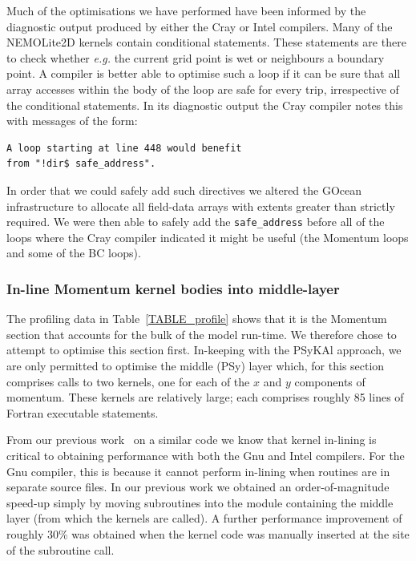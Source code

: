 \documentclass[gmdd, manuscript]{copernicus}
\begin{document}
Much of the optimisations we have performed have been informed by the
diagnostic output produced by either the Cray or Intel compilers. Many
of the NEMOLite2D kernels contain conditional statements. These
statements are there to check whether \textit{e.g.} the current grid
point is wet or neighbours a boundary point. A compiler is better able
to optimise such a loop if it can be sure that all array accesses
within the body of the loop are safe for every trip, irrespective of
the conditional statements. In its diagnostic output the Cray compiler
notes this with messages of the form:
\begin{verbatim}
A loop starting at line 448 would benefit 
from "!dir$ safe_address".
\end{verbatim}
In order that we could safely add such directives we altered the
GOcean infrastructure to allocate all field-data arrays with extents
greater than strictly required.  We were then able to safely add the
\texttt{safe\_address} before all of the loops where the Cray compiler
indicated it might be useful (the Momentum loops and some of the BC
loops).

\subsubsection{In-line Momentum kernel bodies into middle-layer}
\label{sec_inline_mom}

The profiling data in Table~\ref{TABLE_profile} shows that it is the
Momentum section that accounts for the bulk of the model run-time.  We
therefore chose to attempt to optimise this section first. In-keeping
with the {PS}y{KA}l approach, we are only permitted to optimise the middle
(PSy) layer which, for this section comprises calls to two kernels,
one for each of the $x$ and $y$ components of momentum. These kernels
are relatively large; each comprises roughly 85 lines of Fortran
executable statements.

From our previous work~\citep{shallow_psykal} on a similar code we know
that kernel in-lining is critical to obtaining performance with both
the Gnu and Intel compilers. For the Gnu compiler, this is because it
cannot perform in-lining when routines are in separate source
files. In our previous work we obtained an order-of-magnitude speed-up
simply by moving subroutines into the module containing the middle
layer (from which the kernels are called). A further performance
improvement of roughly 30\% was obtained when the kernel code was
manually inserted at the site of the subroutine call.
\end{document}
